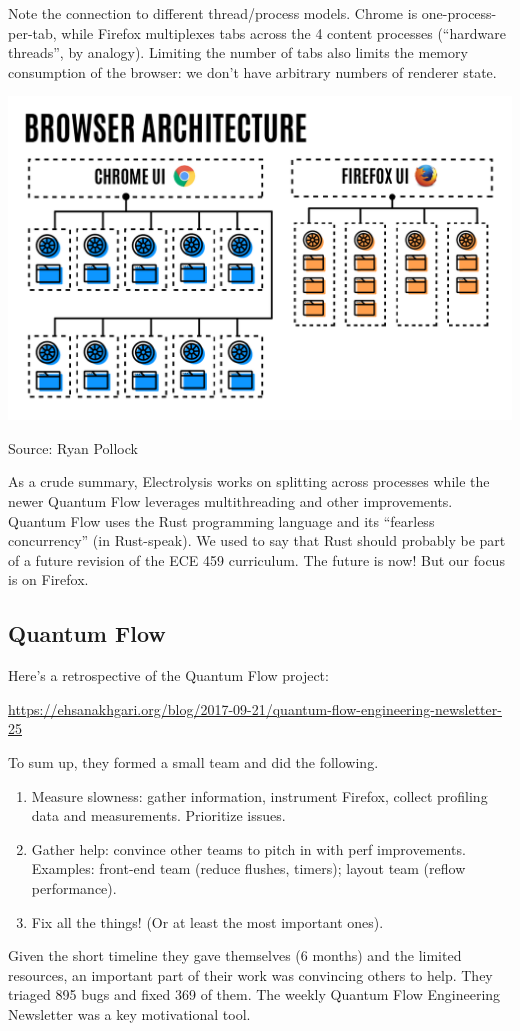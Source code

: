 \documentclass[a4paper]{report}
\begin{document}
Note the connection to different thread/process models.
Chrome is one-process-per-tab, while Firefox multiplexes tabs across
the 4 content processes (``hardware threads'', by analogy). Limiting
the number of tabs also limits the memory consumption of the browser:
we don't have arbitrary numbers of renderer state.

\begin{center}
\includegraphics[width=.9\textwidth]{images/L19-chrome-vs-firefox.png}
\end{center}
Source: Ryan Pollock~\cite{goldilocks}

As a crude summary, Electrolysis works on splitting across processes
while the newer Quantum Flow leverages multithreading and other
improvements.  Quantum Flow uses the Rust programming language and its
``fearless concurrency'' (in Rust-speak). We used to say that Rust should probably be part of a future revision of the ECE 459 curriculum. The future is now! But our focus is on Firefox.

\subsection*{Quantum Flow}
Here's a retrospective of the Quantum Flow project:
\begin{center}
\url{https://ehsanakhgari.org/blog/2017-09-21/quantum-flow-engineering-newsletter-25}
\end{center}

To sum up, they formed a small team and did the following.
\begin{enumerate}[noitemsep]
\item Measure slowness: gather information, instrument Firefox, collect profiling data and measurements. Prioritize issues.
\item Gather help: convince other teams to pitch in with perf improvements. Examples: front-end team (reduce flushes, timers); layout team (reflow performance).
\item Fix all the things! (Or at least the most important ones).
\end{enumerate}
Given the short timeline they gave themselves (6 months) and the limited resources, an important part of their work was convincing others to help.
They triaged 895 bugs and fixed 369 of them. The weekly Quantum Flow Engineering Newsletter was a key motivational tool.
\end{document}
